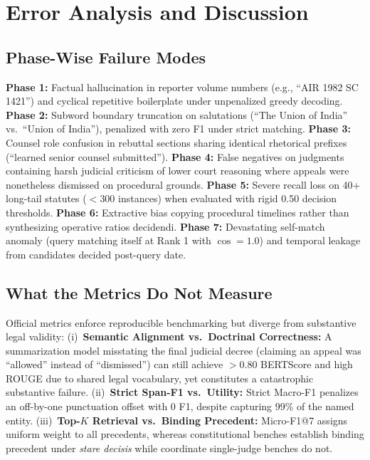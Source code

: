\documentclass[11pt, oneside]{article}
\begin{document}
\section{Error Analysis and Discussion}

\subsection{Phase-Wise Failure Modes}
\noindent
\textbf{Phase 1:} Factual hallucination in reporter volume numbers (e.g., ``AIR 1982 SC 1421'') and cyclical repetitive boilerplate under unpenalized greedy decoding.
\textbf{Phase 2:} Subword boundary truncation on salutations (``The Union of India'' vs.\ ``Union of India''), penalized with zero F1 under strict matching.
\textbf{Phase 3:} Counsel role confusion in rebuttal sections sharing identical rhetorical prefixes (``learned senior counsel submitted'').
\textbf{Phase 4:} False negatives on judgments containing harsh judicial criticism of lower court reasoning where appeals were nonetheless dismissed on procedural grounds.
\textbf{Phase 5:} Severe recall loss on 40+ long-tail statutes ($<300$ instances) when evaluated with rigid 0.50 decision thresholds.
\textbf{Phase 6:} Extractive bias copying procedural timelines rather than synthesizing operative ratios decidendi.
\textbf{Phase 7:} Devastating self-match anomaly (query matching itself at Rank 1 with $\cos=1.0$) and temporal leakage from candidates decided post-query date.

\subsection{What the Metrics Do Not Measure}
Official metrics enforce reproducible benchmarking but diverge from substantive legal validity:
(i)~\textbf{Semantic Alignment vs.\ Doctrinal Correctness:} A summarization model misstating the final judicial decree (claiming an appeal was ``allowed'' instead of ``dismissed'') can still achieve $>0.80$ BERTScore and high ROUGE due to shared legal vocabulary, yet constitutes a catastrophic substantive failure.
(ii)~\textbf{Strict Span-F1 vs.\ Utility:} Strict Macro-F1 penalizes an off-by-one punctuation offset with 0 F1, despite capturing 99\% of the named entity.
(iii)~\textbf{Top-$K$ Retrieval vs.\ Binding Precedent:} Micro-F1@7 assigns uniform weight to all precedents, whereas constitutional benches establish binding precedent under \emph{stare decisis} while coordinate single-judge benches do not.
\end{document}
